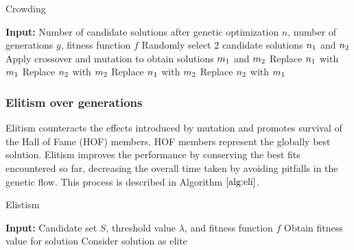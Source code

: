 \documentclass[conference]{IEEEtran}
\begin{document}
\begin{algorithm}[t]
\scriptsize
\caption{Crowding}
\label{alg:crowd}
\begin{algorithmic}[1]
\STATE \textbf{Input:} Number of candidate solutions after genetic optimization $\textit{n}$, number of generations $\textit{g}$, fitness function $\textit{f}$
\STATE Randomly select 2 candidate solutions $n\textsubscript{1}$ and $n\textsubscript{2}$
\STATE Apply crossover and mutation to obtain solutions $m\textsubscript{1}$ and $m\textsubscript{2}$
\STATE Replace $n\textsubscript{1}$ with $m\textsubscript{1}$
\ENDIF
{}
\STATE Replace $n\textsubscript{2}$ with $m\textsubscript{2}$
\ENDIF
\ELSE
{}
\STATE Replace $n\textsubscript{1}$ with $m\textsubscript{2}$
\ENDIF
{}
\STATE Replace $n\textsubscript{2}$ with $m\textsubscript{1}$
\ENDIF
\ENDIF
\ENDWHILE
\ENDFOR
\end{algorithmic}
\end{algorithm}

\subsubsection{Elitism over generations}

Elitism counteracts the effects introduced by mutation and promotes survival of the Hall of Fame (HOF) members. HOF members represent the globally best solution. Elitism improves the performance by conserving the best fits encountered so far, decreasing the overall time taken by avoiding pitfalls in the genetic flow. This process is described in Algorithm $\ref{alg:eli}$.

\begin{algorithm}[t]
\scriptsize
\caption{Elistism}
\label{alg:eli}
\begin{algorithmic}[1]
\STATE \textbf{Input:} Candidate set $\textit{S}$, threshold value $\lambda$, and fitness function $\textit{f}$
\STATE Obtain fitness value for solution
\STATE Consider solution as elite
\ENDIF
\ENDFOR
\end{algorithmic}
\end{algorithm}
\end{document}
